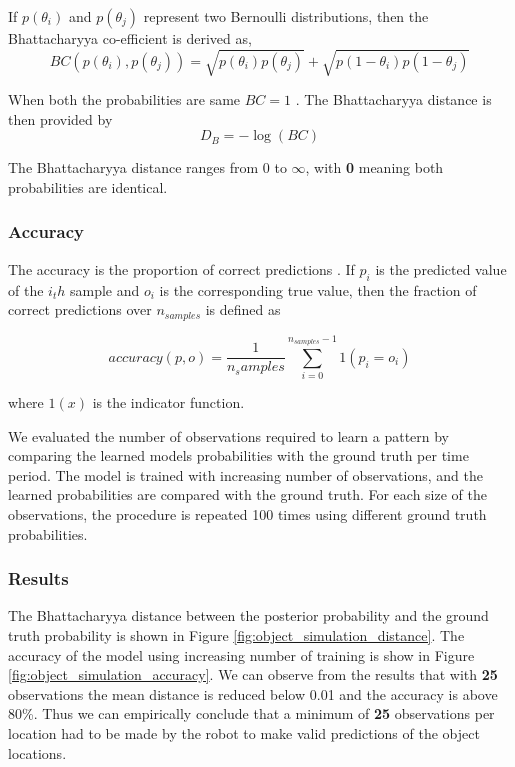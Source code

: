 If $p (\theta_i)$ and $p (\theta_j)$ represent two Bernoulli distributions, then the Bhattacharyya co-efficient is derived as,
\begin{equation}
	BC (p (\theta_i), p (\theta_j)) = \sqrt{p (\theta_i) p (\theta_j)} + \sqrt{p (1- \theta_i) p (1 - \theta_j)}
\end{equation}

When both the probabilities are same $BC = 1$ . The Bhattacharyya distance is then provided by 
\begin{equation}
    D_B = -\log (BC)
\end{equation}

The Bhattacharyya distance ranges from 0 to $\infty$, with \textbf{0} meaning both probabilities are identical. 


\subsubsection*{Accuracy }

The accuracy is the proportion of correct predictions \cite{scikit-learn} . If $p_i$ is the predicted value of the $i_th$ sample and $o_i$ is the corresponding true value, then the fraction of correct predictions over $n_{samples}$ is defined as 

\begin{equation}
	accuracy (p, o) = \frac{1}{n_samples} \sum_{i=0}^{n_{samples} -1 }1 (p_i = o_i)
\end{equation} 

where $ 1 (x)$ is the indicator function.


We evaluated the number of observations required to learn a pattern by comparing the learned models  probabilities with the ground truth per time period. The model is trained with increasing number of observations, and the learned probabilities are compared with the ground truth. For each size of the observations, the procedure is repeated 100 times using different ground truth probabilities.

\subsubsection*{Results}
The Bhattacharyya distance between the posterior probability and the ground truth probability is shown in Figure \ref{fig:object_simulation_distance}. The accuracy of the model using increasing number of training is show in Figure \ref{fig:object_simulation_accuracy}. We can observe from the results that with \textbf{25} observations the mean distance is reduced below 0.01 and the accuracy is above 80\%. Thus we can empirically conclude that a minimum of \textbf{25} observations per location had to be made by the robot to make valid predictions of the object locations. 


